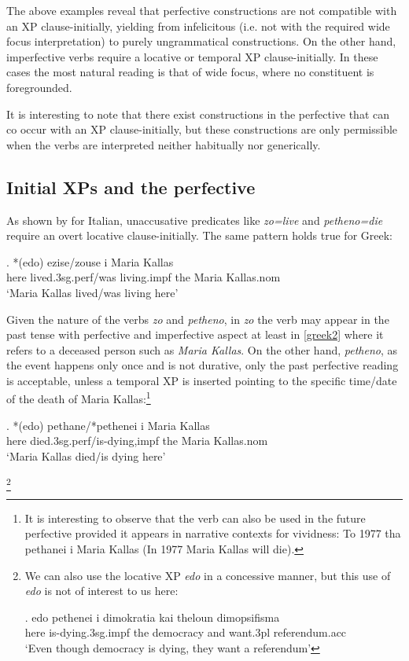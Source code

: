 \documentclass[11pt]{article}
\begin{document}
The above examples reveal that perfective constructions are not compatible with an XP clause-initially, yielding from infelicitous (i.e. not with the required wide focus interpretation) to purely ungrammatical constructions.  On the other hand, imperfective verbs require a locative or temporal XP clause-initially.  In these cases the most natural reading is that of wide focus, where no constituent is foregrounded. 

It is interesting to note that there exist constructions in the perfective that can co occur with an XP clause-initially, but these constructions are only permissible when the verbs are interpreted neither habitually nor generically.

\subsection{Initial XPs  and the perfective}


As shown by \citet{pinto:97} for Italian, unaccusative predicates like \textit{zo=live} and \textit{petheno=die} require an overt locative clause-initially. The same pattern holds true for Greek:

\exg.
*(edo) ezise/zouse	i 		Maria Kallas\\
	here lived.3sg.perf/was living.impf the Maria Kallas.nom\\ \label{greek2}
	`Maria Kallas lived/was living here'

Given the nature of the verbs \textit{zo} and \textit{petheno}, in \textit{zo} the verb may appear in the past tense with perfective and imperfective aspect at least in \ref{greek2} where it refers to a deceased person such as \textit{Maria Kallas}. On the other hand, \textit{petheno}, as the event happens only once and is not durative, only the past perfective reading is acceptable, unless a temporal XP is inserted pointing to the specific time/date of the death of Maria Kallas:\footnote{It is interesting to observe that the verb can also be used in the future perfective provided it appears in narrative contexts for vividness:
To 1977 tha pethanei i Maria Kallas (In 1977 Maria Kallas will die).}

\exg.
*(edo) pethane/*pethenei i Maria Kallas\\
here died.3sg.perf/is-dying,impf the Maria Kallas.nom\\
`Maria Kallas died/is dying here' 

\footnote{We can also use the locative XP \textit{edo} in a concessive manner, but this use of \textit{edo} is not of interest to us here:

\exg.
edo pethenei i dimokratia kai theloun dimopsifisma\\ 
here  is-dying.3sg.impf the democracy and want.3pl referendum.acc\\ \label{greek262}
`Even though democracy is dying, they want a referendum'

}
\end{document}
